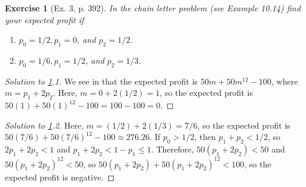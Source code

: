 \documentclass[letterpaper, 10 pt, conference]{article}
\newtheorem{ex}{Exercise}
\begin{document}
\begin{ex}[Ex. 3, p. 392]\label{ex:chain-letter}
	In the chain letter problem (see Example 10.14) find your expected profit if
	\begin{enumerate}
		\item $p_0 = 1/2, p_1 = 0$, and $p_2 = 1/2$.
		\item $p_0 = 1/6, p_1 = 1/2$, and $p_2 = 1/3$.
	\end{enumerate}
\end{ex}
\begin{proof}[Solution to \ref{ex:chain-letter}.1]
	We see in \citet{snell} that the expected profit is $50m + 50 m^{12} - 100$, where $m = p_1 + 2p_2$. Here, $m = 0 + 2(1/2) = 1$, so the expected profit is $50(1) + 50(1)^{12} - 100 = 100 - 100 = 0$.
\end{proof}
\begin{proof}[Solution to \ref{ex:chain-letter}.2]
	Here, $m = (1/2) + 2(1/3) = 7/6$, so the expected profit is $50(7/6) + 50(7/6)^{12} - 100 \approx 276.26$. If $p_0 > 1/2$, then $p_1 + p_2 < 1/2$, so $2 p_1 + 2 p_2 < 1$ and $p_1 + 2p_2 < 1 - p_1 \leq 1$. Therefore, $50 (p_1 + 2 p_2) < 50$ and $50(p_1 + 2p_2)^{12} < 50$, so $50 (p_1 + 2 p_2) + 50 (p_1 + 2 p_2)^{12} < 100$, so the expected profit is negative.
\end{proof}
\end{document}
